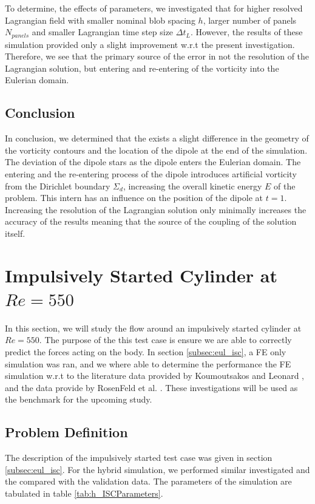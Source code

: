 To determine, the effects of parameters, we investigated that for higher resolved Lagrangian field with smaller nominal blob spacing $h$, larger number of panels $N_{panels}$ and smaller Lagrangian time step size $\Delta t_L$. However, the results of these simulation provided only a slight improvement w.r.t the present investigation. Therefore, we see that the primary source of the error in not the resolution of the Lagrangian solution, but entering and re-entering of the vorticity into the Eulerian domain.


\subsection{Conclusion}

In conclusion, we determined that the exists a slight difference in the geometry of the vorticity contours and the location of the dipole at the end of the simulation. The deviation of the dipole stars as the dipole enters the Eulerian domain. The entering and the re-entering process of the dipole introduces artificial vorticity from the Dirichlet boundary $\Sigma_d$, increasing the overall kinetic energy $E$ of the problem. This intern has an influence on the position of the dipole at $t=1$. Increasing the resolution of the Lagrangian solution only minimally increases the accuracy of the results meaning that the source of the coupling of the solution itself.  


\section{Impulsively Started Cylinder at $Re=550$}

In this section, we will study the flow around an impulsively started cylinder at $Re=550$. The purpose of the this test case is ensure we are able to correctly predict the forces acting on the body. In section \ref{subsec:eul_isc}, a FE only simulation was ran, and we where able to determine the performance the FE simulation w.r.t to the literature data provided by Koumoutsakos and Leonard \cite{Koumoutsakos1995a}, and the data provide by  RosenFeld et al. \cite{MosheRosenFeldDochanKwak1991}. These investigations will be used as the benchmark for the upcoming study.

\subsection{Problem Definition}

The description of the impulsively started test case was given in section \ref{subsec:eul_isc}. For the hybrid simulation, we performed similar investigated and the compared with the validation data. The parameters of the simulation are tabulated in table \ref{tab:h_ISCParameters}. 

